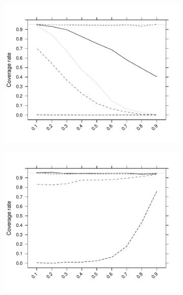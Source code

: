 \documentclass[11pt,a4paper]{article}
\begin{document}
\begin{figure}[t!]
\vspace{-1.1\baselineskip}
\begin{subfigure}{.51\textwidth}
\includegraphics[width = 1.0\linewidth]{Figures/Figure1c.pdf}
\vspace{-2.2\baselineskip}
\subcaption{}
\label{01c}
\end{subfigure}
\begin{subfigure}{.51\textwidth}
\includegraphics[width=1.0\linewidth]{Figures/Figure1d.pdf}
\vspace{-2.2\baselineskip}
\subcaption{}
\label{01d}
\end{subfigure}
\begin{subfigure}{.51\textwidth}

\end{subfigure}
\end{figure}
\end{document}
